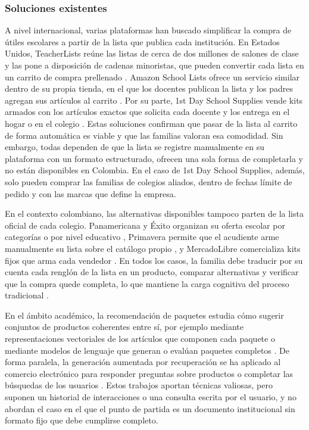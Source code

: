 \subsubsection{Soluciones existentes}

A nivel internacional, varias plataformas han buscado simplificar la compra de útiles
escolares a partir de la lista que publica cada institución. En Estados Unidos, TeacherLists
reúne las listas de cerca de dos millones de salones de clase y las pone a disposición de
cadenas minoristas, que pueden convertir cada lista en un carrito de compra prellenado
\citep{teacherlists_retail_2026}. Amazon School Lists ofrece un servicio similar dentro de
su propia tienda, en el que los docentes publican la lista y los padres agregan sus
artículos al carrito \citep{amazon_schoollists_2025}. Por su parte, 1st Day
School Supplies vende kits armados con los artículos exactos que solicita cada docente y los
entrega en el hogar o en el colegio \citep{firstday_faqs_2026}. Estas soluciones confirman
que pasar de la lista al carrito de forma automática es viable y que las familias valoran
esa comodidad. Sin embargo, todas dependen de que la lista se registre manualmente en su
plataforma con un formato estructurado, ofrecen una sola forma de completarla y no están
disponibles en Colombia. En el caso de 1st Day School Supplies, además, solo pueden
comprar las familias de colegios aliados, dentro de fechas límite de pedido y con las
marcas que define la empresa.\par

En el contexto colombiano, las alternativas disponibles tampoco parten de la lista oficial
de cada colegio. Panamericana y Éxito organizan su oferta escolar por categorías o por
nivel educativo \citep{panamericana_cotizador_2025,exito_listas_2025}, Primavera permite
que el acudiente arme manualmente su lista sobre el catálogo propio
\citep{primavera_armatulista_2026}, y MercadoLibre comercializa kits fijos que arma cada
vendedor \citep{mercadolibre_kits_2025}. En todos los casos, la familia debe traducir por su
cuenta cada renglón de la lista en un producto, comparar alternativas y verificar que la
compra quede completa, lo que mantiene la carga cognitiva del proceso tradicional
\citep{sweller_cognitive_2011}.\par

En el ámbito académico, la recomendación de paquetes estudia cómo sugerir conjuntos de
productos coherentes entre sí, por ejemplo mediante representaciones vectoriales de los
artículos que componen cada paquete \citep{avny_brosh_bruce_2022,du_enhancing_2025} o
mediante modelos de lenguaje que generan o evalúan paquetes completos
\citep{liu_llmcbr_2025,bayrak_evaluating_2024}. De forma paralela, la generación aumentada
por recuperación se ha aplicado al comercio electrónico para responder preguntas sobre
productos \citep{xu_itemrag_2026} o completar las búsquedas de los usuarios
\citep{sun_product-aware_2024}. Estos trabajos aportan técnicas valiosas, pero suponen un
historial de interacciones o una consulta escrita por el usuario, y no abordan el caso en
el que el punto de partida es un documento institucional sin formato fijo que debe
cumplirse completo.\par

